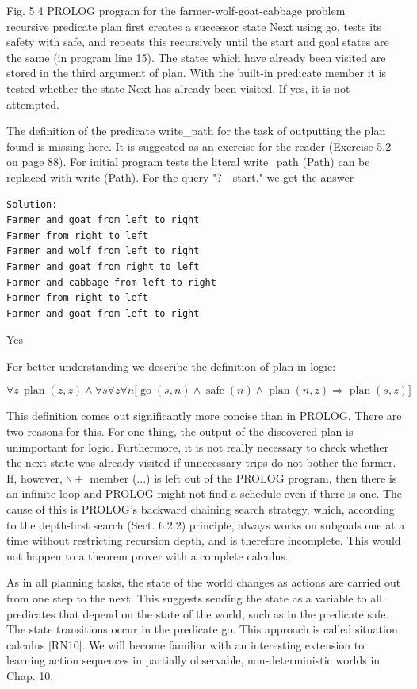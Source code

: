 \documentclass[10pt]{book}
\begin{document}
Fig. 5.4 PROLOG program for the farmer-wolf-goat-cabbage problem\\
recursive predicate plan first creates a successor state Next using go, tests its safety with safe, and repeats this recursively until the start and goal states are the same (in program line 15). The states which have already been visited are stored in the third argument of plan. With the built-in predicate member it is tested whether the state Next has already been visited. If yes, it is not attempted.

The definition of the predicate write\_path for the task of outputting the plan found is missing here. It is suggested as an exercise for the reader (Exercise 5.2 on page 88). For initial program tests the literal write\_path (Path) can be replaced with write (Path). For the query "? - start." we get the answer

\begin{verbatim}
Solution:
Farmer and goat from left to right
Farmer from right to left
Farmer and wolf from left to right
Farmer and goat from right to left
Farmer and cabbage from left to right
Farmer from right to left
Farmer and goat from left to right
\end{verbatim}

Yes

For better understanding we describe the definition of plan in logic:

$$
\forall z\, \operatorname{plan}(z,z) \wedge \forall s \forall z \forall n \bigl[\operatorname{go}(s,n) \wedge \operatorname{safe}(n) \wedge \operatorname{plan}(n,z) \Rightarrow \operatorname{plan}(s,z)\bigr]
$$

This definition comes out significantly more concise than in PROLOG. There are two reasons for this. For one thing, the output of the discovered plan is unimportant for logic. Furthermore, it is not really necessary to check whether the next state was already visited if unnecessary trips do not bother the farmer. If, however, $\backslash+$ member (...) is left out of the PROLOG program, then there is an infinite loop and PROLOG might not find a schedule even if there is one. The cause of this is PROLOG's backward chaining search strategy, which, according to the depth-first search (Sect. 6.2.2) principle, always works on subgoals one at a time without restricting recursion depth, and is therefore incomplete. This would not happen to a theorem prover with a complete calculus.

As in all planning tasks, the state of the world changes as actions are carried out from one step to the next. This suggests sending the state as a variable to all predicates that depend on the state of the world, such as in the predicate safe. The state transitions occur in the predicate go. This approach is called situation calculus [RN10]. We will become familiar with an interesting extension to learning action sequences in partially observable, non-deterministic worlds in Chap. 10.
\end{document}
